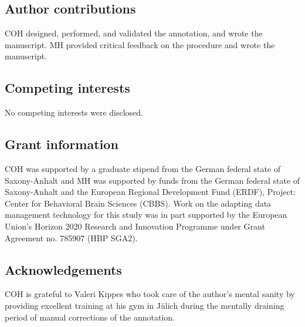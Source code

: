 \documentclass[10pt,a4paper,onecolumn]{article}
\begin{document}
\subsection*{Author contributions}
COH designed, performed, and validated the annotation, and wrote the manuscript.
MH provided critical feedback on the procedure and wrote the manuscript.

\subsection*{Competing interests}
No competing interests were disclosed.

\subsection*{Grant information}
COH was supported by a graduate stipend from the German federal state of
Saxony-Anhalt and MH was supported by funds from the German federal state of
Saxony-Anhalt and the European Regional Development Fund (ERDF), Project:
Center for Behavioral Brain Sciences (CBBS). Work on the adapting data
management technology for this study was in part supported by the European
Union's Horizon 2020 Research and Innovation Programme under Grant Agreement
no. 785907 (HBP SGA2).


\subsection*{Acknowledgements}
COH is grateful to Valeri Kippes who took care of the author's mental sanity by providing excellent training at his gym in Jülich during the mentally draining period of manual corrections of the annotation.

{\small
}
\end{document}
